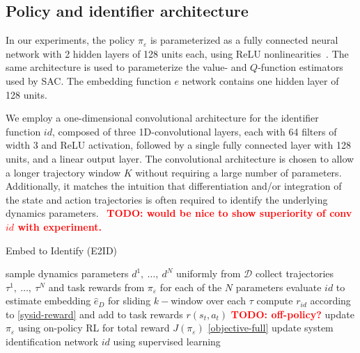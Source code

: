 \documentclass{article}
\newcommand{\E}{\mathbb{E}}
\newcommand{\TODO}[1]{\textcolor{red}{\textbf{TODO: #1}}}
\newcommand{\cH}{\mathcal{H}}
\newcommand{\embedfn}{e}
\newcommand{\idfn}{id}
\newcommand{\idset}{\mathcal{D}}
\newcommand{\idvar}{d}
\newcommand{\latvar}{\varepsilon}
\begin{document}
\subsection{Policy and identifier architecture}
In our experiments,
the policy $\pi_\latvar$ is parameterized as a fully connected neural network
with 2 hidden layers of 128 units each, using ReLU nonlinearities~\cite{nair-ReLU}.
The same architecture is used to parameterize the value- and $Q$-function estimators used by SAC.
The embedding function $\embedfn$ network contains one hidden layer of 128 units.

We employ a one-dimensional convolutional architecture for the identifier function $\idfn$,
composed of three 1D-convolutional layers, each with 64 filters of width 3 and ReLU activation,
followed by a single fully connected layer with 128 units, and a linear output layer.
The convolutional architecture is chosen to allow a longer trajectory window $K$ without requiring a large number of parameters.
Additionally, it matches the intuition that differentiation and/or integration of the state and action trajectories
is often required to identify the underlying dynamics parameters.
~\TODO{would be nice to show superiority of conv $\idfn$ with experiment.}




\begin{algorithm}[hb]
\caption{Embed to Identify (E2ID)}
\begin{algorithmic}
  \State sample dynamics parameters $\idvar^1,\ \dots,\ \idvar^N$ uniformly from $\idset$
  \State collect trajectories $\tau^1,\ \dots,\ \tau^N$ and task rewards from $\pi_\latvar$ for each of the $N$ parameters
  \State evaluate $\idfn$ to estimate embedding $\hat e_D$ for sliding $k-$window over each $\tau$
  \State compute $r_{\idfn}$ according to \eqref{sysid-reward} and add to task rewards $r(s_t,a_t)$
  \State \TODO{off-policy?} update $\pi_\latvar$ using on-policy RL for total reward $J(\pi_\latvar)$ \eqref{objective-full}
  \State update system identification network $\idfn$ using supervised learning
\EndFor
\end{algorithmic}
\label{algo}
\end{algorithm}
\end{document}
